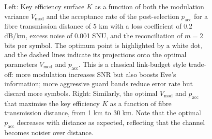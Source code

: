 ﻿\documentclass[12pt]{article}
\begin{document}
\begin{figure}[t]
  \endgroup
  \caption{Left: Key efficiency surface $K$ as a function of both the modulation variance $V_\text{mod}$ and the acceptance rate of the post-selection $p_\text{acc}$ for a fibre transmission distance of 5 km with a loss coefficient of 0.2 dB/km, excess noise of 0.001 SNU, and the reconciliation of $m = 2$ bits per symbol. The optimum point is highlighted by a white dot, and the dashed lines indicate its projections onto the optimal parameters $V_{\mathrm{mod}}$ and $p_{\mathrm{acc}}$. This is a classical link-budget style trade-off: more modulation increases SNR but also boosts Eve's information; more aggressive guard bands reduce error rate but discard more symbols. Right: Similarly, the optimal $V_\text{mod}$ and $p_\text{acc}$ that maximise the key efficiency $K$ as a function of fibre transmission distance, from 1 km to 30 km. Note that the optimal $p_\text{acc}$ decreases with distance as expected, reflecting that the channel becomes noisier over distance.}
  \label{fig:key_efficiency_surface_group}
\end{figure}
\end{document}

